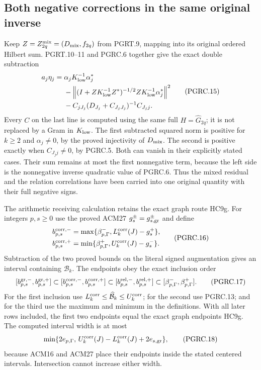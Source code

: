 \subsection{Both negative corrections in the same original inverse}

Keep $Z=Z_{2q}^{\rm mix}=(D_{\rm mix},f_{2q})$ from PGRT.9,
mapping into its original ordered Hilbert sum. PGRT.10--11 and
PGRC.6 together give the exact double subtraction
\[
 \begin{aligned}
 a_j\eta_j={}&\alpha_jK_{\rm low}^{-1}\alpha_j^*\\
 &-\left\|(I+ZK_{\rm low}^{-1}Z^*)^{-1/2}
                      ZK_{\rm low}^{-1}\alpha_j^*\right\|^2\\
 &-C_{jJ_j}(D_{J_j}+C_{J_jJ_j})^{-1}C_{J_jj}.
 \end{aligned}
 \tag{PGRC.15}\label{eq:pgrc-double-subtraction}
\]
Every $C$ on the last line is computed using the same full
$H=\widehat G_{2q}$; it is not replaced by a Gram in
$K_{\rm low}$. The first subtracted squared norm is positive
for $k\geq2$ and $\alpha_j\ne0$, by the proved injectivity of
$D_{\rm mix}$. The second is positive exactly when
$C_{J_jj}\ne0$, by PGRC.5. Both can vanish in their explicitly
stated cases. Their sum remains at most the first nonnegative term,
because the left side is the nonnegative inverse quadratic value
of PGRC.6. Thus the mixed residual and the relation correlations
have been carried into one original quantity with their full
negative signs.

The arithmetic receiving calculation retains the exact graph
route HC9g. For integers $p,s\geq0$ use the proved ACM27
$g_s^\pm=g_{s,\rm gr}^\pm$ and define
\[
 \begin{aligned}
 b_{p,s}^{\rm corr,-}
 &=\max\{\beta_{p,\Gamma}^-,L_k^{\rm corr}(J)-g_s^+\},\\
 b_{p,s}^{\rm corr,+}
 &=\min\{\beta_{p,\Gamma}^+,U_k^{\rm corr}(J)-g_s^-\}.
 \end{aligned}
 \tag{PGRC.16}\label{eq:pgrc-arithmetic-return}
\]
Subtraction of the two proved bounds on the literal signed
augmentation gives an interval containing $\mathcal B_k$.
The endpoints obey the exact inclusion order
\[
 [b_{p,s}^{\rm gr,-},b_{p,s}^{\rm gr,+}]
 \subset [b_{p,s}^{\rm corr,-},b_{p,s}^{\rm corr,+}]
 \subset [b_{p,s}^{\rm rel,-},b_{p,s}^{\rm rel,+}]
 \subset [\beta_{p,\Gamma}^-,\beta_{p,\Gamma}^+].
 \tag{PGRC.17}\label{eq:pgrc-nesting}
\]
For the first inclusion use
$L_k^{\rm corr}\leq\widehat{\mathcal B}_k\leq U_k^{\rm corr}$;
for the second use PGRC.13; and for the third use the maximum
and minimum in the definitions. With all later rows included,
the first two endpoints equal the exact graph endpoints HC9g.
The computed interval width is at most
\[
 \min\{2e_{p,\Gamma},\,
       U_k^{\rm corr}(J)-L_k^{\rm corr}(J)+2e_{s,\rm gr}\},
 \tag{PGRC.18}\label{eq:pgrc-arithmetic-width}
\]
because ACM16 and ACM27 place their endpoints inside the stated
centered intervals. Intersection cannot increase either width.

